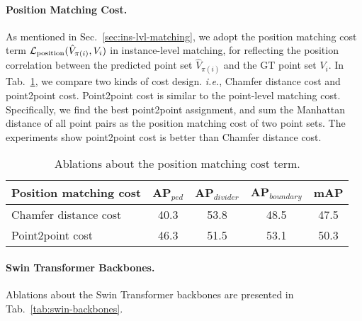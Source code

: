 \documentclass{article} \usepackage{iclr2023_conference,times}
\def\ie{\emph{i.e.}} \def\Ie{\emph{I.e.}}
\begin{document}
\paragraph{Position Matching Cost.}
As mentioned in Sec.~\ref{sec:ins-lvl-matching}, we adopt the position matching cost term $\mathcal{L}_{\rm position}(\hat{V}_{\pi(i)}, V_i)$ in instance-level matching, for reflecting the position correlation between the predicted point set $\hat{V}_{\pi(i)}$ and the GT point set $V_i$. 
In Tab.~\ref{tab:position-matching-cost}, we compare two kinds of cost design. \ie, Chamfer distance cost and point2point cost. 
Point2point cost is similar to the point-level matching cost. Specifically, we find the best point2point assignment, and sum the Manhattan distance of all point pairs as the  position matching cost of two point sets.
The experiments show point2point cost is better than Chamfer distance cost.
\begin{table}[ht!]
\begin{center}
\begin{tabular}{l|ccc|c}
\hline
\rowcolor{Gray}
Position matching cost& AP$_{\textit{ped}}$ & AP$_{\textit{divider}}$ & AP$_{\textit{boundary}}$ &mAP\\
\toprule
Chamfer distance cost & 40.3 & 53.8 & 48.5& 47.5 \\
Point2point cost  &\cellcolor{blue!10}46.3&\cellcolor{blue!10}51.5&\cellcolor{blue!10}53.1&\cellcolor{blue!10}50.3\\
\bottomrule
\end{tabular}
\end{center}
\vspace*{-0.45cm}
\caption{Ablations about the position matching cost term.}
\label{tab:position-matching-cost}
\vspace*{-0.35cm}
\end{table}

\paragraph{Swin Transformer Backbones.} Ablations about the Swin Transformer backbones \citep{swin} are presented in Tab.~\ref{tab:swin-backbones}. 
\end{document}
